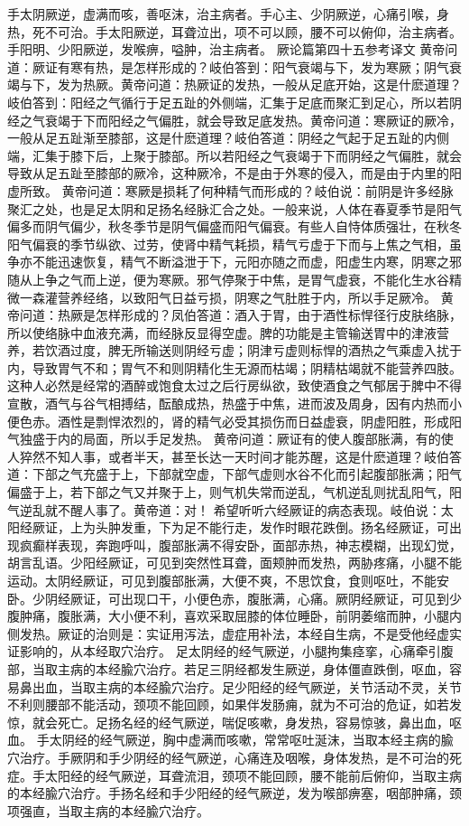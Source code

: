 \documentclass[a4paper,12pt,UTF8,twoside]{ctexbook}
\begin{document}
手太阴厥逆，虚满而咳，善呕沫，治主病者。手心主、少阴厥逆，心痛引喉，身热，死不可治。手太阳厥逆，耳聋泣出，项不可以顾，腰不可以俯仰，治主病者。手阳明、少阳厥逆，发喉痹，嗌肿，治主病者。
厥论篇第四十五参考译文
黄帝问道：厥证有寒有热，是怎样形成的？岐伯答到：阳气衰竭与下，发为寒厥；阴气衰竭与下，发为热厥。黄帝问道：热厥证的发热，一般从足底开始，这是什麽道理？岐伯答到：阳经之气循行于足五趾的外侧端，汇集于足底而聚汇到足心，所以若阴经之气衰竭于下而阳经之气偏胜，就会导致足底发热。黄帝问道：寒厥证的厥冷，一般从足五趾渐至膝部，这是什麽道理？岐伯答道：阴经之气起于足五趾的内侧端，汇集于膝下后，上聚于膝部。所以若阳经之气衰竭于下而阴经之气偏胜，就会导致从足五趾至膝部的厥冷，这种厥冷，不是由于外寒的侵入，而是由于内里的阳虚所致。
黄帝问道：寒厥是损耗了何种精气而形成的？岐伯说：前阴是许多经脉聚汇之处，也是足太阴和足扬名经脉汇合之处。一般来说，人体在春夏季节是阳气偏多而阴气偏少，秋冬季节是阴气偏盛而阳气偏衰。有些人自恃体质强壮，在秋冬阳气偏衰的季节纵欲、过劳，使肾中精气耗损，精气亏虚于下而与上焦之气相，虽争亦不能迅速恢复，精气不断溢泄于下，元阳亦随之而虚，阳虚生内寒，阴寒之邪随从上争之气而上逆，便为寒厥。邪气停聚于中焦，是胃气虚衰，不能化生水谷精微一森灌营养经络，以致阳气日益亏损，阴寒之气肚胜于内，所以手足厥冷。
黄帝问道：热厥是怎样形成的？凤伯答道：酒入于胃，由于酒性标悍径行皮肤络脉，所以使络脉中血液充满，而经脉反显得空虚。脾的功能是主管输送胃中的津液营养，若饮酒过度，脾无所输送则阴经亏虚；阴津亏虚则标悍的酒热之气乘虚入扰于内，导致胃气不和；胃气不和则阴精化生无源而枯竭；阴精枯竭就不能营养四肢。这种人必然是经常的酒醉或饱食太过之后行房纵欲，致使酒食之气郁居于脾中不得宣散，酒气与谷气相搏结，酝酿成热，热盛于中焦，进而波及周身，因有内热而小便色赤。酒性是剽悍浓烈的，肾的精气必受其损伤而日益虚衰，阴虚阳胜，形成阳气独盛于内的局面，所以手足发热。
黄帝问道：厥证有的使人腹部胀满，有的使人猝然不知人事，或者半天，甚至长达一天时间才能苏醒，这是什麽道理？岐伯答道：下部之气充盛于上，下部就空虚，下部气虚则水谷不化而引起腹部胀满；阳气偏盛于上，若下部之气又并聚于上，则气机失常而逆乱，气机逆乱则扰乱阳气，阳气逆乱就不醒人事了。黄帝道：对！
希望听听六经厥证的病态表现。岐伯说：太阳经厥证，上为头肿发重，下为足不能行走，发作时眼花跌倒。扬名经厥证，可出现疯癫样表现，奔跑呼叫，腹部胀满不得安卧，面部赤热，神志模糊，出现幻觉，胡言乱语。少阳经厥证，可见到突然性耳聋，面颊肿而发热，两胁疼痛，小腿不能运动。太阴经厥证，可见到腹部胀满，大便不爽，不思饮食，食则呕吐，不能安卧。少阴经厥证，可出现口干，小便色赤，腹胀满，心痛。厥阴经厥证，可见到少腹肿痛，腹胀满，大小便不利，喜欢采取屈膝的体位睡卧，前阴萎缩而肿，小腿内侧发热。厥证的治则是：实证用泻法，虚症用补法，本经自生病，不是受他经虚实证影响的，从本经取穴治疗。
足太阴经的经气厥逆，小腿拘集痉挛，心痛牵引腹部，当取主病的本经腧穴治疗。若足三阴经都发生厥逆，身体僵直跌倒，呕血，容易鼻出血，当取主病的本经腧穴治疗。足少阳经的经气厥逆，关节活动不灵，关节不利则腰部不能活动，颈项不能回顾，如果伴发肠痈，就为不可治的危证，如若发惊，就会死亡。足扬名经的经气厥逆，喘促咳嗽，身发热，容易惊骇，鼻出血，呕血。
手太阴经的经气厥逆，胸中虚满而咳嗽，常常呕吐涎沫，当取本经主病的腧穴治疗。手厥阴和手少阴经的经气厥逆，心痛连及咽喉，身体发热，是不可治的死症。手太阳经的经气厥逆，耳聋流泪，颈项不能回顾，腰不能前后俯仰，当取主病的本经腧穴治疗。手扬名经和手少阳经的经气厥逆，发为喉部痹塞，咽部肿痛，颈项强直，当取主病的本经腧穴治疗。
\end{document}

